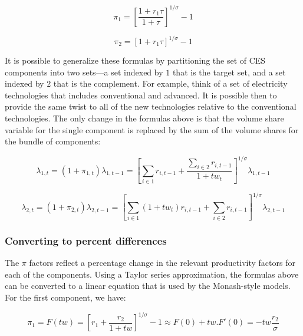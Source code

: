\begin{equation}
\label{eq:AllocTwistpi1}
\pi_1
= \left[
\frac{1+r_1 \tau}{1+\tau}
\right]^{1/\sigma} - 1
\end{equation}

\begin{equation}
\label{eq:AllocTwistpi2}
\pi_2=\left[
{1+r_1 \tau}
\right]^{1/\sigma} - 1
\end{equation}

It is possible to generalize these formulas by partitioning the set of
CES components into two sets---a set indexed by $1$ that is the target set, and a set
indexed by $2$ that is the complement. For example, think of a set of electricity technologies
that includes conventional and advanced. It is possible then to provide the same twist to
all of the new technologies relative to the conventional technologies. The only change
in the formulas above is that the volume share variable for the single component is
replaced by the sum of the volume shares for the bundle of components:

\begin{displaymath}
{{\lambda }_{1,t}}=(1+{{\pi }_{1,t}}){{\lambda }_{1,t-1}}=
\left[ \sum_{i\in{1}} {r_{i,t-1}} + \frac{\sum_{i\in{2}} {r_{i,t-1}}}{1 + \mathit{tw}_{t}}
\right]^{1/\sigma} \lambda_{1,t-1}
\end{displaymath}

\begin{displaymath}
{{\lambda }_{2,t}}=(1+{{\pi }_{2,t}}){{\lambda }_{2,t-1}}=
\left[ \sum_{i\in{1}} {\left( 1 + \mathit{tw}_{t}\right) r_{i,t-1}}  + \sum_{i\in{2}} {r_{i,t-1}}
\right]^{1/\sigma} \lambda_{2,t-1}
\end{displaymath}

\subsubsection{Converting to percent differences}

The $\pi$ factors reflect a percentage change in the relevant productivity
factors for each of the components. Using a Taylor series approximation,
the formulas above can be converted to a linear equation that is
used by the Monash-style models. For the first component, we have:

\begin{displaymath}
\pi_1=F(tw) = \left[ r_1+\frac{r_2}{1+\mathit{tw}} \right]^{1/\sigma}-1 \approx F(0) + tw.F'(0)=-tw \frac{r_2} {\sigma}
\end{displaymath}

